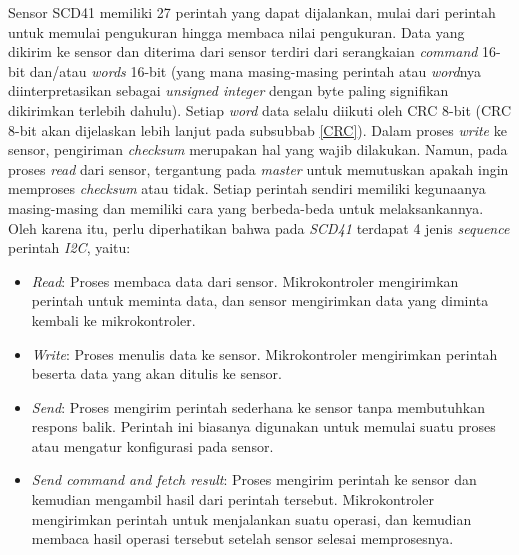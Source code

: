        Sensor SCD41 memiliki 27 perintah yang dapat dijalankan, mulai dari perintah untuk memulai pengukuran hingga membaca nilai pengukuran. Data yang dikirim ke sensor dan diterima dari sensor terdiri dari serangkaian \textit{command} 16-bit dan/atau \textit{words} 16-bit (yang mana masing-masing perintah atau \textit{word}nya diinterpretasikan sebagai \textit{unsigned integer} dengan byte paling signifikan dikirimkan terlebih dahulu). Setiap \textit{word} data selalu diikuti oleh CRC 8-bit (CRC 8-bit akan dijelaskan lebih lanjut pada subsubbab \ref{CRC}). Dalam proses \textit{write} ke sensor, pengiriman \textit{checksum} merupakan hal yang wajib dilakukan. Namun, pada proses \textit{read} dari sensor, tergantung pada \textit{master} untuk memutuskan apakah ingin memproses \textit{checksum} atau tidak. Setiap perintah sendiri memiliki kegunaanya masing-masing dan memiliki cara yang berbeda-beda untuk melaksankannya. Oleh karena itu, perlu diperhatikan bahwa pada \textit{SCD41} terdapat 4 jenis \textit{sequence} perintah \textit{I2C}, yaitu:
        \begin{itemize}
            \item \textit{Read}: Proses membaca data dari sensor. Mikrokontroler mengirimkan perintah untuk meminta data, dan sensor mengirimkan data yang diminta kembali ke mikrokontroler.
            \item \textit{Write}: Proses menulis data ke sensor. Mikrokontroler mengirimkan perintah beserta data yang akan ditulis ke sensor.
            \item \textit{Send}: Proses mengirim perintah sederhana ke sensor tanpa membutuhkan respons balik. Perintah ini biasanya digunakan untuk memulai suatu proses atau mengatur konfigurasi pada sensor.
            \item \textit{Send command and fetch result}: Proses mengirim perintah ke sensor dan kemudian mengambil hasil dari perintah tersebut. Mikrokontroler mengirimkan perintah untuk menjalankan suatu operasi, dan kemudian membaca hasil operasi tersebut setelah sensor selesai memprosesnya.
        \end{itemize}

